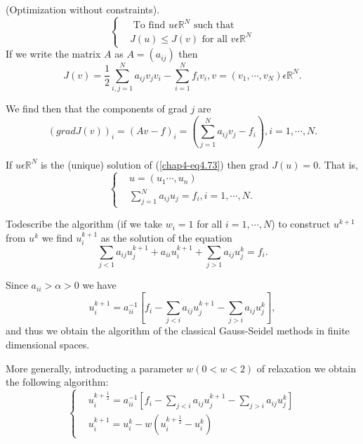 \begin{example}\label{chap4-exam4.4}
(Optimization without constraints).
\begin{equation*}
\begin{cases}
& \text{ To find } u \epsilon \mathbb{R}^{N} \text{ such that }\\
& J(u) \leq J(v) \text{ for all } v \epsilon \mathbb{R}^{N}\tag{4.73}\label{chap4-eq4.73}
\end{cases}
\end{equation*}
If we write the matrix $A$ as $A = (a_{ij})$ then
\begin{equation*}
J(v) = \frac{1}{2} \sum_{i, j=1}^{N} a_{ij} v_{j} v_{i} - \sum_{i=1}^{N} f_{i} v_{i}, v = (v_{1}, \cdots , v_{N}) \epsilon \mathbb{R}^{N}.\tag{4.74}\label{chap4-eq4.74} 
\end{equation*}
\end{example}

We find then that the components of grad $j$ are 
$$
(grad J(v))_{i} = (Av-f)_{i} = ( \sum_{j=1}^{N} a_{ij} v_{j} - f_{i}), i = 1, \cdots, N. 
$$

If $u \epsilon \mathbb{R}^{N}$ is the (unique) solution of (\ref{chap4-eq4.73}) then grad $J(u) = 0$. That is,
\begin{equation*}
\begin{cases}
& u = (u_{1} \cdots, u_{n})\\
& \sum_{j=1}^{N} a_{ij} u_{j} = f_{i}, i = 1, \cdots , N.
\end{cases}
\end{equation*}

To\pageoriginale describe the algorithm (if we take $w_{i} = 1$ for all $i = 1, \cdots , N$) to construct $u^{k+1}$ from $u^{k}$ we find $u_{i}^{k+1}$ as the solution of the equation
$$
\sum_{j<1} a_{ij} u_{j}^{k+1} + a_{ii} u_{i}^{k+1} + \sum_{j>1} a_{ij} u_{j}^{k} = f_{i}.
$$

Since $a_{ii} > \alpha > 0$ we have
\begin{equation*}
u_{i}^{k+1} = a_{ii}^{-1} [f_{i} - \sum_{j<i} a_{ij} u_{j}^{k+1} - \sum_{j>i} a_{ij} u_{j}^{k}],\tag{4.75}\label{chap4-eq4.75}
\end{equation*}
and thus we obtain the algorithm of the classical Gauss-Seidel methods in finite dimensional spaces.

More generally, introducting a parameter $w(0 < w < 2)$ of relaxation we obtain the following algorithm:
\begin{equation*}
\begin{cases}
& u_{i}^{k+\frac{1}{2}} = a_{ii}^{-1} [f_{i} - \sum\limits_{j<i} a_{ij} u_{j}^{k+1} - \sum\limits_{j>i} a_{ij} u_{j}^{k}]\\
& u_{i}^{k+1} = u_{i}^{k} - w(u_{i}^{k+\frac{1}{2}} - u_{i}^{k})\tag{4.76}\label{chap4-eq4.76}
\end{cases}
\end{equation*}

